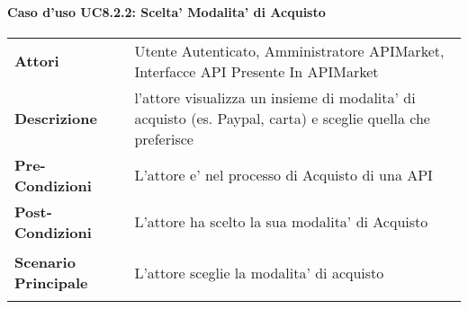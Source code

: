 \paragraph{Caso d'uso UC8.2.2: Scelta' Modalita' di Acquisto}
\label{UC8.2.2}

\renewcommand*{\arraystretch}{1.6}
\begin{longtable}{ l | p{11cm}}
	\hline
	\rowcolor{Gray}
	\multicolumn{2}{c}{UC8.2.2: Scelta' Modalita' di Acquisto} \\
	\hline
	\textbf{Attori} &Utente Autenticato, Amministratore APIMarket, Interfacce API Presente In APIMarket \\
	\textbf{Descrizione} & l'attore visualizza un insieme di modalita' di acquisto (es. Paypal, carta) e sceglie quella che preferisce\\
	\textbf{Pre-Condizioni} & L'attore e' nel processo di Acquisto di una API\\
	\textbf{Post-Condizioni}& L'attore ha scelto la sua modalita' di Acquisto\\
	\textbf{Scenario Principale} & \begin{enumerate*}[label=(\arabic*.),itemjoin={\newline}]
		\item L'attore sceglie la modalita' di acquisto
	\end{enumerate*}\\
\end{longtable}
